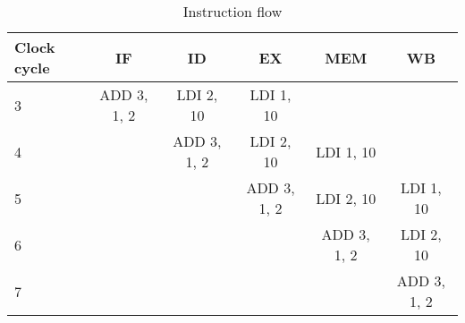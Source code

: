 \begin{table}
\center
\begin{tabular}{|l | c | c | c | c |c|}
    \hline
    Clock cycle & IF & ID & EX & MEM & WB \\
    \hline
    3 & ADD 3, 1, 2  & LDI 2, 10  & LDI 1, 10   &              &              \\
    4 &            & ADD 3, 1, 2  & LDI 2, 10   & LDI 1, 10    &              \\
    5 &            &              & ADD 3, 1, 2 & LDI 2, 10    & LDI 1, 10    \\
    6 &            &              &             & ADD 3, 1, 2  & LDI 2, 10    \\
    7 &            &              &             &              & ADD 3, 1, 2  \\
    \hline
\end{tabular}
\caption{Instruction flow}
\label{testing:tbl:instrflow}
\end{table}




